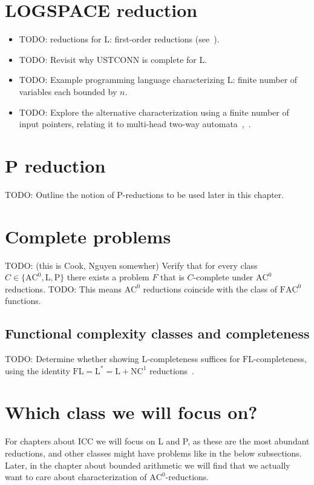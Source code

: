 \section{LOGSPACE reduction}
\begin{itemize}
\item TODO: reductions for L: first-order reductions (see~\cite[Section~5.1]{Immerman1999-IMMDC}).
\item TODO: Revisit why USTCONN is complete for L.
\item TODO: Example programming language characterizing L: finite number of variables each bounded by $n$.
\item TODO: Explore the alternative characterization using a finite number of input pointers, relating it to multi-head two-way automata~\cite{423885},~\cite{10.1007/BF00289513}.
\end{itemize}

\section{P reduction}
TODO: Outline the notion of P-reductions to be used later in this chapter.

\section{Complete problems}
\label{sec:complete-problems}
TODO: (this is Cook, Nguyen somewher) Verify that for every class $C \in \{\text{AC}^0, \text{L}, \text{P}\}$ there exists a problem $F$ that is $C$-complete under $\text{AC}^0$ reductions.
TODO: This means $\text{AC}^0$ reductions coincide with the class of $\mathrm{FAC}^0$ functions.

\subsection{Functional complexity classes and completeness}
TODO: Determine whether showing $\text{L}$-completeness suffices for $\text{FL}$-completeness, using the identity $\text{FL} = \text{L}^* = \text{L} + \text{NC}^1$ reductions~\cite[Proposition~4.1]{COOK19852}.

\section{Which class we will focus on?}
\label{sec:classes-of-interest}
For chapters about ICC we will focus on L and P, as these are the most abundant reductions,
and other classes might have problems like in the below subsections.
Later, in the chapter about bounded arithmetic we will find that we actually want to care
about characterization of $\text{AC}^0$-reductions.

